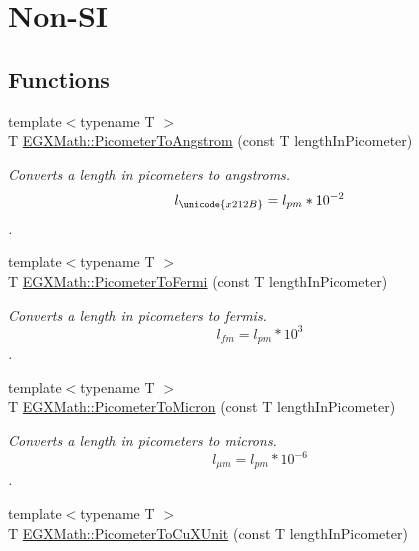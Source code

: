 \hypertarget{group___e_g_x_math-_conversions-_length_conversions-_picometer-_non-_s_i}{}\section{Non-\/\+SI}
\label{group___e_g_x_math-_conversions-_length_conversions-_picometer-_non-_s_i}
\subsection*{Functions}
\begin{DoxyCompactItemize}
\item 
{\footnotesize template$<$typename T $>$ }\\T \mbox{\hyperlink{group___e_g_x_math-_conversions-_length_conversions-_picometer-_non-_s_i_ga0b1b4a3ec4ea0110477f4547025d2719}{E\+G\+X\+Math\+::\+Picometer\+To\+Angstrom}} (const T length\+In\+Picometer)
\begin{DoxyCompactList}\small\item\em Converts a length in picometers to angstroms. \[ l_{\unicode{x212B}}=l_{pm} * 10^{-2} \]. \end{DoxyCompactList}\item 
{\footnotesize template$<$typename T $>$ }\\T \mbox{\hyperlink{group___e_g_x_math-_conversions-_length_conversions-_picometer-_non-_s_i_ga13ec47b0b50eca30313bb7902a28f0c9}{E\+G\+X\+Math\+::\+Picometer\+To\+Fermi}} (const T length\+In\+Picometer)
\begin{DoxyCompactList}\small\item\em Converts a length in picometers to fermis. \[ l_{fm}=l_{pm} * 10^{3} \]. \end{DoxyCompactList}\item 
{\footnotesize template$<$typename T $>$ }\\T \mbox{\hyperlink{group___e_g_x_math-_conversions-_length_conversions-_picometer-_non-_s_i_gad8fddabe74b111596888c370081f725e}{E\+G\+X\+Math\+::\+Picometer\+To\+Micron}} (const T length\+In\+Picometer)
\begin{DoxyCompactList}\small\item\em Converts a length in picometers to microns. \[ l_{\mu m}=l_{pm} * 10^{-6} \]. \end{DoxyCompactList}\item 
{\footnotesize template$<$typename T $>$ }\\T \mbox{\hyperlink{group___e_g_x_math-_conversions-_length_conversions-_picometer-_non-_s_i_gab393c0c7c90ba14ff56f8eac343524ff}{E\+G\+X\+Math\+::\+Picometer\+To\+Cu\+X\+Unit}} (const T length\+In\+Picometer)

\end{DoxyCompactItemize}
